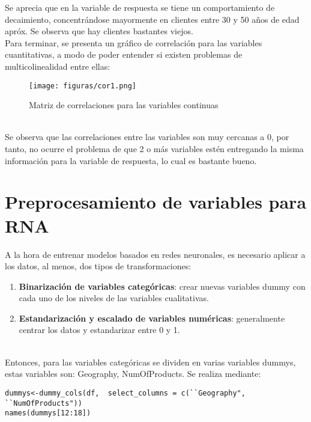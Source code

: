 \documentclass{report}
\begin{document}
Se aprecia que en la variable de respuesta se tiene un comportamiento de decaimiento, concentrándose mayormente en clientes entre 30 y 50 años de edad apróx. Se observa que hay clientes bastantes viejos.\\

Para terminar, se presenta un gráfico de correlación para las variables cuantitativas, a modo de poder entender si existen problemas de multicolinealidad entre ellas:\\
\begin{figure}[htp]
        \centering
    	\texttt{[image: figuras/cor1.png]}
    	\label{fig: Figura1}
    	\caption{Matriz de correlaciones para las variables continuas}
        \end{figure}\\      

Se observa que las correlaciones entre las variables son muy cercanas a 0, por tanto, no ocurre el problema de que 2 o más variables estén entregando la misma información para la variable de respuesta, lo cual es bastante bueno.\\

\newpage
\section{Preprocesamiento de variables para RNA}
A la hora de entrenar modelos basados en redes neuronales, es necesario aplicar a los datos, al menos, dos tipos de transformaciones:
        \begin{enumerate}
            \item \textbf{Binarización de variables categóricas}: crear nuevas variables dummy con cada uno de los niveles de las variables cualitativas.
            \item \textbf{Estandarización y escalado de variables numéricas}:  generalmente centrar los datos y estandarizar entre 0 y 1.
        \end{enumerate}\\
Entonces, para las variables categóricas se dividen en varias variables dummys, estas variables son: Geography, NumOfProducts. Se realiza mediante:\\

\begin{lstlisting}[Language=R, caption={Creación de variables dummys},captionpos=b]
dummys<-dummy_cols(df,  select_columns = c(``Geography", ``NumOfProducts"))
names(dummys[12:18])
\end{lstlisting}\\
        
\end{document}
